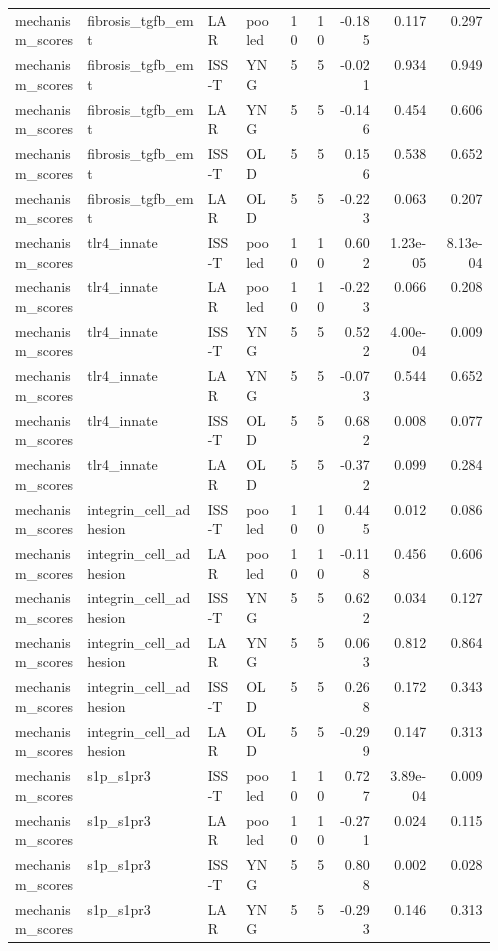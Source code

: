 \documentclass[11pt]{article}
\begin{document}
\begin{landscape}
\begin{longtable}{p{0.15\linewidth}p{0.25\linewidth}p{0.08\linewidth}p{0.08\linewidth}rrrrr}
mechanism\_scores & fibrosis\_tgfb\_emt & LAR & pooled & 10 & 10 & -0.185 & 0.117 & 0.297 \\
mechanism\_scores & fibrosis\_tgfb\_emt & ISS-T & YNG & 5 & 5 & -0.021 & 0.934 & 0.949 \\
mechanism\_scores & fibrosis\_tgfb\_emt & LAR & YNG & 5 & 5 & -0.146 & 0.454 & 0.606 \\
mechanism\_scores & fibrosis\_tgfb\_emt & ISS-T & OLD & 5 & 5 & 0.156 & 0.538 & 0.652 \\
mechanism\_scores & fibrosis\_tgfb\_emt & LAR & OLD & 5 & 5 & -0.223 & 0.063 & 0.207 \\
mechanism\_scores & tlr4\_innate & ISS-T & pooled & 10 & 10 & 0.602 & 1.23e-05 & 8.13e-04 \\
mechanism\_scores & tlr4\_innate & LAR & pooled & 10 & 10 & -0.223 & 0.066 & 0.208 \\
mechanism\_scores & tlr4\_innate & ISS-T & YNG & 5 & 5 & 0.522 & 4.00e-04 & 0.009 \\
mechanism\_scores & tlr4\_innate & LAR & YNG & 5 & 5 & -0.073 & 0.544 & 0.652 \\
mechanism\_scores & tlr4\_innate & ISS-T & OLD & 5 & 5 & 0.682 & 0.008 & 0.077 \\
mechanism\_scores & tlr4\_innate & LAR & OLD & 5 & 5 & -0.372 & 0.099 & 0.284 \\
mechanism\_scores & integrin\_cell\_adhesion & ISS-T & pooled & 10 & 10 & 0.445 & 0.012 & 0.086 \\
mechanism\_scores & integrin\_cell\_adhesion & LAR & pooled & 10 & 10 & -0.118 & 0.456 & 0.606 \\
mechanism\_scores & integrin\_cell\_adhesion & ISS-T & YNG & 5 & 5 & 0.622 & 0.034 & 0.127 \\
mechanism\_scores & integrin\_cell\_adhesion & LAR & YNG & 5 & 5 & 0.063 & 0.812 & 0.864 \\
mechanism\_scores & integrin\_cell\_adhesion & ISS-T & OLD & 5 & 5 & 0.268 & 0.172 & 0.343 \\
mechanism\_scores & integrin\_cell\_adhesion & LAR & OLD & 5 & 5 & -0.299 & 0.147 & 0.313 \\
mechanism\_scores & s1p\_s1pr3 & ISS-T & pooled & 10 & 10 & 0.727 & 3.89e-04 & 0.009 \\
mechanism\_scores & s1p\_s1pr3 & LAR & pooled & 10 & 10 & -0.271 & 0.024 & 0.115 \\
mechanism\_scores & s1p\_s1pr3 & ISS-T & YNG & 5 & 5 & 0.808 & 0.002 & 0.028 \\
mechanism\_scores & s1p\_s1pr3 & LAR & YNG & 5 & 5 & -0.293 & 0.146 & 0.313 \\

\end{longtable}
\end{landscape}
\end{document}
